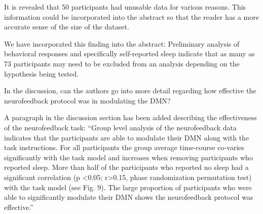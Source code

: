 \documentclass{article}
\newcommand{\RESPONSE}[1]{\textcolor{responseblue}{#1}}
\begin{document}
It is revealed that 50 participants had unusable data for various reasons. This information could be incorporated into the abstract so that the reader has a more accurate sense of the size of the dataset.

\RESPONSE{We have incorporated this finding into the abstract: Preliminary analysis of behavioral responses and specifically self-reported sleep indicate that as many as 73 participants may need to be excluded from an analysis depending on the hypothesis being tested.}

In the discussion, can the authors go into more detail regarding how effective the neurofeedback protocol was in modulating the DMN?

\RESPONSE{A paragraph in the discussion section has been added describing the effectiveness of the neurofeedback task: ``Group level analysis of the neurofeedback data indicates that the participants are able to modulate their DMN along with the task instructions. For all participants the group average time-course co-varies significantly with the task model and increases when removing participants who reported sleep. More than half of the  participants who reported no sleep had a  significant correlation (p \textless 0.05; r\textgreater 0.15, phase randomization permutation test) with the task model (see Fig. 9). The large proportion of participants who were able to significantly modulate their DMN shows the neurofeedback protocol was effective.''}
\end{document}
